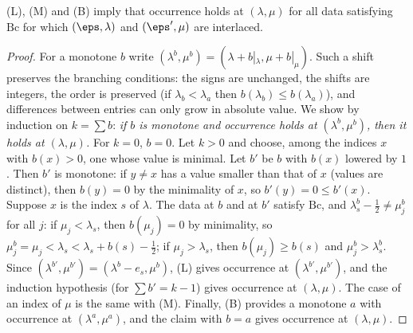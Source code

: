 \begin{lemma}\label{pf:fs:walk}
(L), (M) and (B) imply that occurrence holds at $(\lambda,\mu)$ for all data satisfying $\mathrm{Bc}$ for which $(\eps,\lambda)$ and $(\eps',\mu)$ are
interlaced.
\end{lemma}

\begin{proof}
For a monotone $b$ write $(\lambda^b,\mu^b)=(\lambda+b|_\lambda,\mu+b|_\mu)$. Such a shift preserves the branching conditions: the signs are
unchanged, the shifts are integers, the order is preserved (if $\lambda_b<\lambda_a$ then $b(\lambda_b)\le b(\lambda_a)$), and differences between
entries can only grow in absolute value. We show by induction on $k=\sum b$: \emph{if $b$ is monotone and occurrence holds at $(\lambda^b,\mu^b)$,
then it holds at $(\lambda,\mu)$.} For $k=0$, $b=0$. Let $k>0$ and choose, among the indices $x$ with $b(x)>0$, one whose value is minimal. Let $b'$ be
$b$ with $b(x)$ lowered by $1$. Then $b'$ is monotone: if $y\ne x$ has a value smaller than that of $x$ (values are distinct), then $b(y)=0$ by
the minimality of $x$, so $b'(y)=0\le b'(x)$. Suppose $x$ is the index $s$ of $\lambda$. The data at $b$ and at $b'$ satisfy $\mathrm{Bc}$, and
$\lambda^b_s-\frac12\ne\mu^b_j$ for all $j$: if $\mu_j<\lambda_s$, then $b(\mu_j)=0$ by minimality, so $\mu^b_j=\mu_j<\lambda_s<\lambda_s+b(s)-\frac12$;
if $\mu_j>\lambda_s$, then $b(\mu_j)\ge b(s)$ and $\mu^b_j>\lambda^b_s$. Since $(\lambda^{b'},\mu^{b'})=(\lambda^b-e_s,\mu^b)$, (L) gives occurrence at
$(\lambda^{b'},\mu^{b'})$, and the induction hypothesis (for $\sum b'=k-1$) gives occurrence at $(\lambda,\mu)$. The case of an index of $\mu$ is the
same with (M). Finally, (B) provides a monotone $a$ with occurrence at $(\lambda^a,\mu^a)$, and the claim with $b=a$ gives occurrence at
$(\lambda,\mu)$.
\end{proof}

